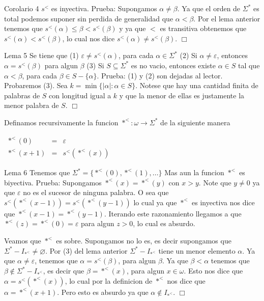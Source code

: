 Corolario 4 \(s^{< }\) es inyectiva.
Prueba: Supongamos \(\alpha \neq \beta .\) Ya que el orden de \(\Sigma ^{\ast }\) es total podemos suponer sin perdida de generalidad que \(\alpha < \beta .\) Por el lema anterior tenemos que \(s^{< }(\alpha )\leq \beta < s^{< }(\beta )\) y ya que \(< \) es transitiva obtenemos que \(s^{< }(\alpha )< s^{< }(\beta )\), lo cual nos dice \(s^{< }(\alpha )\neq s^{< }(\beta )\). \(\Box\)

Lema 5 Se tiene que
(1) \(\varepsilon \neq s^{< }(\alpha )\), para cada \(\alpha \in \Sigma ^{\ast }\)
(2) Si \(\alpha \neq \varepsilon \), entonces \(\alpha =s^{< }(\beta )\) para algun \(\beta \)
(3) Si \(S\subseteq \Sigma ^{\ast }\) es no vacio, entonces existe \( \alpha \in S\) tal que \(\alpha < \beta \), para cada \(\beta \in S-\{\alpha \}\).
Prueba: (1) y (2) son dejadas al lector. Probaremos (3). Sea \(k=\min \{\left\vert \alpha \right\vert :\alpha \in S\}\). Notese que hay una cantidad finita de palabras de \(S\) con longitud igual a \(k\) y que la menor de ellas es justamente la menor palabra de \(S\). \(\Box\)

Definamos recursivamente la funcion \(\ast ^{< }:\omega \rightarrow \Sigma ^{\ast }\) de la siguiente manera

\(\displaystyle \begin{array}{rcl} \ast ^{< }(0) & =& \varepsilon \\ \ast ^{< }(x+1) & =& s^{< }(\ast ^{< }(x)) \end{array} \)

Lema 6 Tenemos que
\(\displaystyle \Sigma ^{\ast }=\{\ast ^{< }(0),\ast ^{< }(1),...\} \)
Mas aun la funcion \(\ast ^{< }\) es biyectiva.
Prueba: Supongamos \(\ast ^{< }(x)=\ast ^{< }(y)\) con \(x >y\). Note que \(y\neq 0\) ya que \( \varepsilon \) no es el sucesor de ninguna palabra. O sea que \(s^{< }(\ast ^{< }(x-1))=s^{< }(\ast ^{< }(y-1))\) lo cual ya que \(\ast ^{< }\) es inyectiva nos dice que \(\ast ^{< }(x-1)=\ast ^{< }(y-1)\). Iterando este razonamiento llegamos a que \(\ast ^{< }(z)=\ast ^{< }(0)=\varepsilon \) para algun \(z >0\), lo cual es absurdo.

Veamos que \(\ast ^{< }\) es sobre. Supongamos no lo es, es decir supongamos que \(\Sigma ^{\ast }-I_{\ast ^{< }}\neq \varnothing \). Por (3) del lema anterior \(\Sigma ^{\ast }-I_{\ast ^{< }}\) tiene un menor elemento \(\alpha \). Ya que \(\alpha \neq \varepsilon \), tenemos que \(\alpha =s^{< }(\beta )\), para algun \(\beta \). Ya que \(\beta < \alpha \) tenemos que \(\beta \notin \Sigma ^{\ast }-I_{\ast ^{< }}\), es decir que \(\beta =\ast ^{< }(x)\), para algun \( x\in \omega \). Esto nos dice que \(\alpha =s^{< }(\ast ^{< }(x))\), lo cual por la definicion de \(\ast ^{< }\) nos dice que \(\alpha =\ast ^{< }(x+1)\). Pero esto es absurdo ya que \(\alpha \notin I_{\ast ^{< }}\). \(\Box\)


